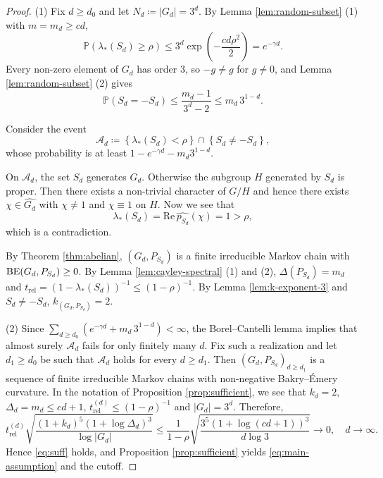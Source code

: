 \documentclass[a4paper, reqno, 11pt]{amsart}
\theoremstyle{definition}
\begin{document}
\begin{proof}
(1) 
Fix $d \ge d_{0}$ and let $N_{d} \coloneqq |G_{d}| = 3^{d}$.
By Lemma \ref{lem:random-subset} (1) with $m = m_{d} \ge cd$,
\[ \mathbb{P}\left(\lambda_{*}(S_{d}) \ge \rho\right) \le 3^{d} \exp\left(-\frac{c d \rho^{2}}{2}\right)  = e^{-\gamma d}. \]
Every non-zero element of $G_{d}$ has order $3$, so $-g \ne g$ for $g \ne 0$, and Lemma \ref{lem:random-subset} (2) gives
\[ \mathbb{P}\left(S_{d} = -S_{d}\right) \le \frac{m_{d} - 1}{3^{d} - 2} \le m_{d}\, 3^{1-d}. \]

Consider the event 
\[ \mathcal{A}_d \coloneqq \left\{\lambda_{*}(S_{d}) < \rho\right\} \cap \left\{S_{d} \ne -S_{d}\right\},\] 
whose probability is at least $1 - e^{-\gamma d} - m_{d} 3^{1-d}$.

On $\mathcal{A}_d$, the set $S_{d}$ generates $G_{d}$. 
Otherwise the subgroup $H$ generated by $S_{d}$ is proper. 
Then there exists a non-trivial character of $G/H$ and 
hence there exists $\chi \in \widehat{G_{d}}$ with $\chi \ne 1$ and $\chi \equiv 1$ on $H$. 
Now we see that 
\[ \lambda_{*}(S_{d}) = \mathrm{Re}\, \widehat{p_{S_{d}}}(\chi) = 1 > \rho, \]
which is a contradiction. 


By Theorem \ref{thm:abelian}, $(G_{d}, P_{S_{d}})$ is a finite irreducible Markov chain with $\textup{BE}(G_{d}, P_{S_{d}}) \ge 0$.
By Lemma \ref{lem:cayley-spectral} (1) and (2), $\Delta(P_{S_{d}}) = m_{d}$ and $t_{\mathrm{rel}} = \left(1 - \lambda_{*}(S_{d})\right)^{-1} \le (1-\rho)^{-1}$.
By Lemma \ref{lem:k-exponent-3} and $S_{d} \ne -S_{d}$, $k_{(G_{d}, P_{S_{d}})} = 2$.

(2)
Since $\sum_{d \ge d_{0}} \left(e^{-\gamma d} + m_{d}\, 3^{1-d}\right) < \infty$, the Borel--Cantelli lemma implies that almost surely $\mathcal{A}_d$ fails for only finitely many $d$.
Fix such a realization and let $d_{1} \ge d_{0}$ be such that $\mathcal{A}_d$ holds for every $d \ge d_{1}$.
Then $\left(G_{d}, P_{S_{d}}\right)_{d \ge d_{1}}$ is a sequence of finite irreducible Markov chains with non-negative Bakry--\'Emery curvature. 
In the notation of Proposition \ref{prop:sufficient}, we see that $k_{d} = 2$, $\Delta_{d} = m_{d} \le cd + 1$, $t_{\mathrm{rel}}^{(d)} \le (1-\rho)^{-1}$ and $|G_{d}| = 3^{d}$. 
Therefore, 
\[ t_{\mathrm{rel}}^{(d)} \sqrt{\frac{(1+k_{d})^{5}\left(1+\log \Delta_{d}\right)^{3}}{\log |G_{d}|}}   \le \frac{1}{1-\rho} \sqrt{\frac{3^{5} \left(1 + \log(cd+1)\right)^{3}}{d \log 3}}  \to 0, \quad d \to \infty. \]
Hence \eqref{eq:suff} holds, and Proposition \ref{prop:sufficient} yields \eqref{eq:main-assumption} and the cutoff.
\end{proof}
\end{document}
